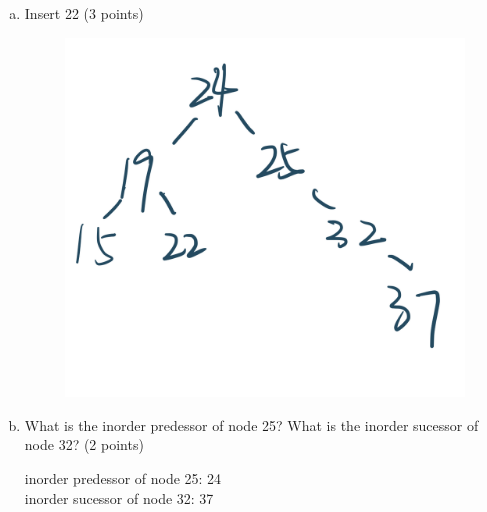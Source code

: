 \documentclass[11pt]{exam}
\begin{document}
\begin{enumerate}[a)]
\item Insert 22 (3 points)
\begin{solution}
\begin{figure}[H]
    \centering
    \includegraphics[width=.4\linewidth]{6.png}
\end{figure}
\end{solution}

\item What is the inorder predessor of node 25? What is the inorder sucessor of node 32? (2 points)
\begin{solution}
\par
inorder predessor of node 25: 24\\
inorder sucessor of node 32: 37
\end{solution}


\end{enumerate}
\end{document}
